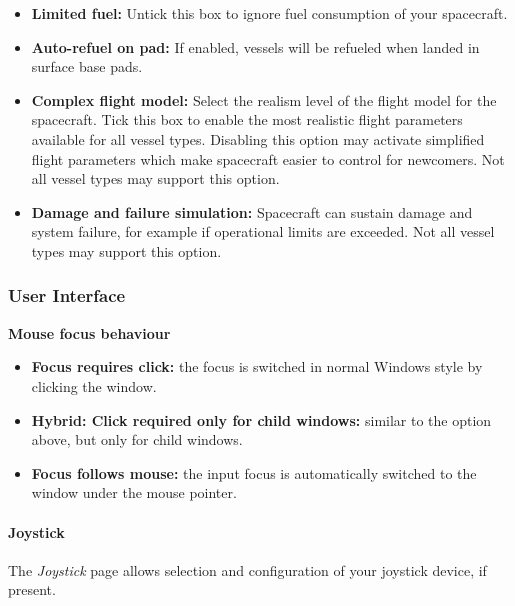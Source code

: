 \documentclass[Orbiter User Manual.tex]{subfiles}
\begin{document}
\begin{itemize}
\item \textbf{Limited fuel:} Untick this box to ignore fuel consumption of your spacecraft.
\item \textbf{Auto-refuel on pad:} If enabled, vessels will be refueled when landed in surface base pads.
\item \textbf{Complex flight model:} Select the realism level of the flight model for the spacecraft. Tick this box to enable the most realistic flight parameters available for all vessel types. Disabling this option may activate simplified flight parameters which make spacecraft easier to control for newcomers. Not all vessel types may support this option.
\item \textbf{Damage and failure simulation:} Spacecraft can sustain damage and system failure, for example if operational limits are exceeded. Not all vessel types may support this option.
\end{itemize}

\subsubsection{User Interface}

\begin{figure}[H]
	\centering
\end{figure}

\textbf{Mouse focus behaviour}
\begin{itemize}
\item \textbf{Focus requires click:} the focus is switched in normal Windows style by clicking the window.
\item \textbf{Hybrid: Click required only for child windows:} similar to the option above, but only for child windows.
\item \textbf{Focus follows mouse:} the input focus is automatically switched to the window under the mouse pointer.
\end{itemize}

\paragraph{Joystick}
The \textit{Joystick} page allows selection and configuration of your joystick device, if present.
\end{document}
